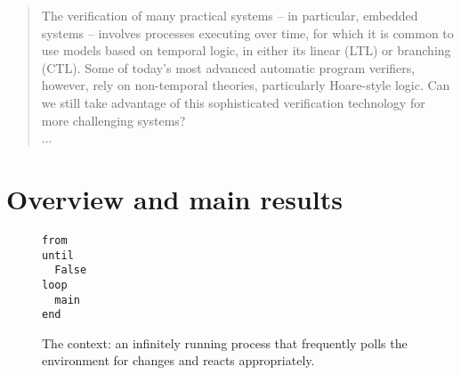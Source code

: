 \begin{abstract}
The verification of many practical systems -- in particular, embedded systems -- involves processes executing over time, for which it is common to use models based on temporal logic, in either its linear (LTL) or branching (CTL). Some of today’s most advanced automatic program verifiers, however, rely on non-temporal theories, particularly Hoare-style logic. Can we still take advantage of this sophisticated verification technology for more challenging systems? \\
...
%
%

\end{abstract}

\section{Overview and main results}
\label{sec:overview}

\begin{figure}
\begin{lstlisting}
from
until
  False
loop
  main
end
\end{lstlisting}
\caption{The context: an infinitely running process that frequently polls the environment for changes and reacts appropriately.}
\label{fig:inifinitely_running_process}
\end{figure}


